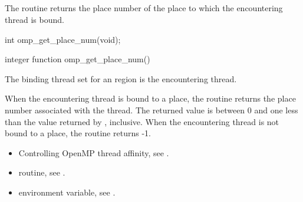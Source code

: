 \subsection{}
\label{subsec:omp_get_place_num}

\summary
The  routine returns the place number 
of the place to which the encountering thread is bound.

\format
\begin{ccppspecific}
\begin{ompcFunction}
int omp_get_place_num(void);
\end{ompcFunction}
\end{ccppspecific}

\begin{fortranspecific}
\begin{ompfFunction}
integer function omp_get_place_num()
\end{ompfFunction}
\end{fortranspecific}

\binding
The binding thread set for an  region is 
the encountering thread.

\effect
When the encountering thread is bound to a place, the
 routine returns the place number associated
with the thread. The returned value is between 0 and one less than the
value returned by , inclusive. When the
encountering thread is not bound to a place, the routine returns -1.

\crossreferences
\begin{itemize}
\item Controlling OpenMP thread affinity, see
.

\item {} routine, see
.

\item {} environment variable, see
.
\end{itemize}



\subsection{}
\label{subsec:omp_get_partition_num_places}

